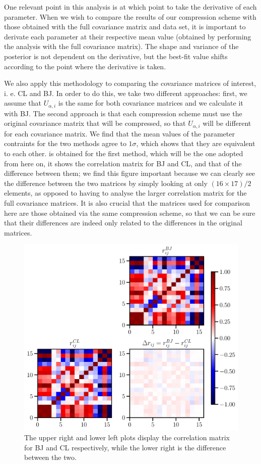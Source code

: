 \documentclass[twocolumn]{\docclass}
\begin{document}
	One relevant point in this analysis is at which point to take the derivative of each parameter. When we wish to compare the results of our compression scheme with those obtained with the full covariance matrix and data set, it is important to derivate each parameter at their respective mean value (obtained by performing the analysis with the full covariance matrix). The shape and variance of the posterior is not dependent on the derivative, but the best-fit value shifts according to the point where the derivative is taken.
	
	We also apply this methodology to comparing the covariance matrices of interest, i. e. CL and BJ. In order to do this, we take two different approaches: first, we assume that $U_{\alpha, i}$ is the same for both covariance matrices and we calculate it with BJ. The second approach is that each compression scheme must use the original covariance matrix that will be compressed, so that $U_{\alpha, i}$ will be different for each covariance matrix. We find that the mean values of the parameter contraints for the two methods agree to $1 \sigma$, which shows that they are equivalent to each other.  is obtained for the first method, which will be the one adopted from here on, it shows the correlation matrix for BJ and CL, and that of the difference between them; we find this figure important because we can clearly see the difference between the two matrices by simply looking at only $(16 \times 17)/2$ elements, as opposed to having to analyse the larger correlation matrix for the full covariance matrices. It is also crucial that the matrices used for comparison here are those obtained via the same compression scheme, so that we can be sure that their differences are indeed only related to the differences in the original matrices.
	
	
	\begin{figure}
		\includegraphics[width=0.9\columnwidth]{Correlation_compression.pdf}
		\caption{The upper right and lower left plots display the correlation matrix for BJ and CL respectively, while the lower right is the difference between the two. \label{fig:correlation}}
	\end{figure}
	
\end{document}

